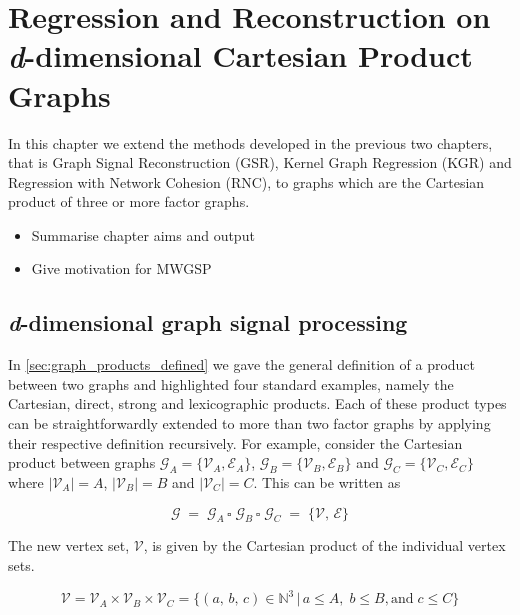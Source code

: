 

\chapter{Regression and Reconstruction on \textit{d}-dimensional Cartesian Product Graphs}


\label{chap:nd_gsp}

In this chapter we extend the methods developed in the previous two chapters, that is Graph Signal Reconstruction (GSR), Kernel Graph Regression (KGR) and Regression with Network Cohesion (RNC), to graphs which are the Cartesian product of three or more factor graphs. 

\begin{itemize}
    \item Summarise chapter aims and output
    \item Give motivation for MWGSP
\end{itemize}


\section{\textit{d}-dimensional graph signal processing}

In \cref{sec:graph_products_defined} we gave the general definition of a product between two graphs and highlighted four standard examples, namely the Cartesian, direct, strong and lexicographic products. Each of these product types can be straightforwardly extended to more than two factor graphs by applying their respective definition recursively. For example, consider the Cartesian product between graphs $\mathcal{G}_A = \{\mathcal{V}_A, \mathcal{E}_A\}$, $\mathcal{G}_B = \{\mathcal{V}_B, \mathcal{E}_B\}$ and $\mathcal{G}_C = \{\mathcal{V}_C, \mathcal{E}_C\}$ where $|\mathcal{V}_A| = A$, $|\mathcal{V}_B| = B$ and $|\mathcal{V}_C| = C$. This can be written as 

\begin{equation}
    \mathcal{G} \; = \; \mathcal{G}_A \, \square \; \mathcal{G}_B \, \square \; \mathcal{G}_C \; = \; \{\mathcal{V}, \, \mathcal{E}\}
\end{equation}

The new vertex set, $\mathcal{V}$, is given by the Cartesian product of the individual vertex sets. 

\begin{equation}
    \mathcal{V} = \mathcal{V}_A \times \mathcal{V}_B \times \mathcal{V}_C = \{(a, \, b, \, c) \in \mathbb{N}^3 \, | \, a \leq A, \; b \leq B, \text{and} \;  c \leq C\}
\end{equation}

